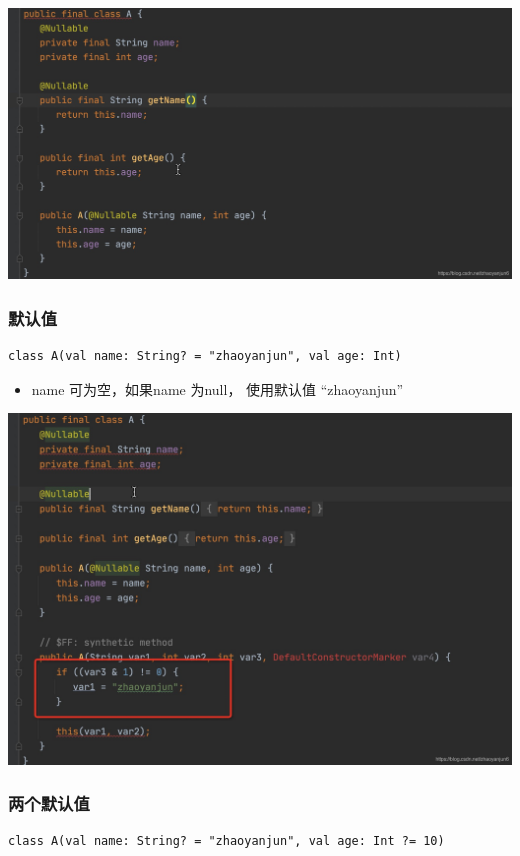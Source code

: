 \documentclass[9pt, b5paper]{article}
\begin{document}
\includegraphics[width=.9\linewidth]{./pic/eg6.png}

\subsubsection{默认值}
\label{sec-5-4-3}
\begin{verbatim}
class A(val name: String? = "zhaoyanjun", val age: Int)
\end{verbatim}
\begin{itemize}
\item name 可为空，如果name 为null， 使用默认值 “zhaoyanjun”
\end{itemize}

\includegraphics[width=.9\linewidth]{./pic/eg7.png}

\subsubsection{两个默认值}
\label{sec-5-4-4}
\begin{verbatim}
class A(val name: String? = "zhaoyanjun", val age: Int ?= 10)
\end{verbatim}
\end{document}
